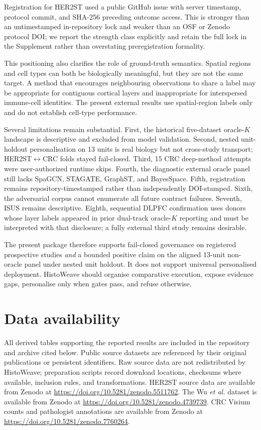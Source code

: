 \documentclass[12pt]{article}
\newcommand{\software}{HistoWeave}
\begin{document}
Registration for HER2ST used a public GitHub issue with server timestamp,
protocol commit, and SHA-256 preceding outcome access. This is stronger than an
untimestamped in-repository lock and weaker than an OSF or Zenodo protocol DOI;
we report the strength class explicitly and retain the full lock in the
Supplement rather than overstating preregistration formality.

This positioning also clarifies the role of ground-truth semantics. Spatial
regions and cell types can both be biologically meaningful, but they are not
the same target. A method that encourages neighbouring observations to share
a label may be appropriate for contiguous cortical layers and inappropriate
for interspersed immune-cell identities. The present external results use
spatial-region labels only and do not establish cell-type performance.

Several limitations remain substantial. First, the historical five-dataset
oracle-\(K\) landscape is descriptive and excluded from model validation.
Second, nested unit-holdout personalisation on 13 units is real biology but
not cross-study transport; HER2ST$\leftrightarrow$CRC folds stayed fail-closed.
Third, 15 CRC deep-method attempts were user-authorized runtime skips.
Fourth, the diagnostic external oracle panel still lacks SpaGCN, STAGATE,
GraphST, and BayesSpace. Fifth, registration remains repository-timestamped
rather than independently DOI-stamped. Sixth, the adversarial corpus cannot
enumerate all future contract failures. Seventh, ISUS remains descriptive.
Eighth, sequential DLPFC confirmation uses donors whose layer labels appeared
in prior dual-track oracle-\(K\) reporting and must be interpreted with that
disclosure; a fully external third study remains desirable.

The present package therefore supports fail-closed governance on registered
prospective studies \emph{and} a bounded positive claim on the aligned
13-unit non-oracle panel under nested unit holdout. It does not support
universal personalised deployment. \software{} should organise comparative
execution, expose evidence gaps, personalise only when gates pass, and refuse
otherwise.

\section*{Data availability}

All derived tables supporting the reported results are included in the
repository and archive cited below. Public source datasets are referenced by
their original publications or persistent identifiers. Raw source data are
not redistributed by \software{}; preparation scripts record download
locations, checksums where available, inclusion rules, and transformations.
HER2ST source data are available from Zenodo at
\url{https://doi.org/10.5281/zenodo.5511762}. The Wu \textit{et al.} dataset
is available from Zenodo at
\url{https://doi.org/10.5281/zenodo.4739739}. CRC Visium counts and pathologist
annotations are available from Zenodo at
\url{https://doi.org/10.5281/zenodo.7760264}.
\end{document}
